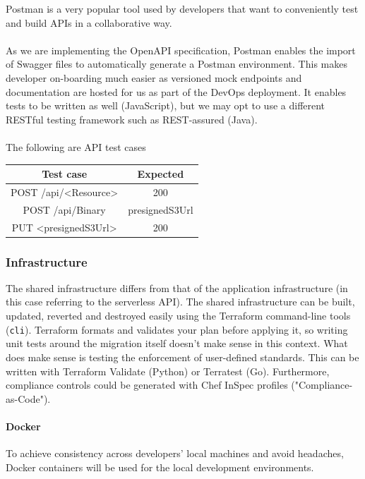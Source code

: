 \documentclass[10pt]{article}
\begin{document}
Postman is a very popular tool used by developers that want to conveniently test and build APIs in a collaborative way.
\\ \\
As we are implementing the OpenAPI specification, Postman enables the import of Swagger files to automatically generate a Postman environment. This makes developer on-boarding much easier as versioned mock endpoints and documentation are hosted for us as part of the DevOps deployment. It enables tests to be written as well (JavaScript), but we may opt to use a different RESTful testing framework such as REST-assured (Java).
\\ \\
The following are API test cases
\begin{center}
	\begin{tabular}{ |c|c| } 
		\hline
		Test case & Expected \\
		\hline
		POST /api/\textless Resource\textgreater & 200 \\ 
		POST /api/Binary & presignedS3Url \\
		PUT \textless presignedS3Url\textgreater & 200 \\
		\hline
	\end{tabular}
\end{center}

\subsubsection{Infrastructure}
The shared infrastructure differs from that of the application infrastructure (in this case referring to the serverless API). The shared infrastructure can be built, updated, reverted and destroyed easily using the Terraform command-line tools (\texttt{cli}). Terraform formats and validates your plan before applying it, so writing unit tests around the migration itself doesn't make sense in this context. What does make sense is testing the enforcement of user-defined standards. This can be written with Terraform Validate (Python) or Terratest (Go). Furthermore, compliance controls could be generated with Chef InSpec profiles ("Compliance-as-Code").

\paragraph{Docker}
To achieve consistency across developers' local machines and avoid headaches, Docker containers will be used for the local development environments.
\end{document}
